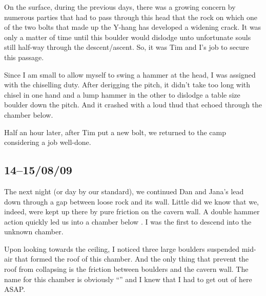 On the surface, during the previous days, there was a growing concern by
numerous parties that had to pass through this head that the rock on
which one of the two bolts that made up the Y-hang has developed a
widening crack. It was only a matter of time until this boulder would
dislodge unto unfortunate souls still half-way through the
descent/ascent. So, it was Tim and I's job to secure this passage.

Since I am small to allow myself to swing a hammer at the head, I was
assigned with the chiselling duty. After derigging the pitch, it didn't
take too long with chisel in one hand and a lump hammer in the other to
dislodge a table size boulder down the pitch. And it crashed with a loud
thud that echoed through the chamber below.

Half an hour later, after Tim put a new bolt, we returned to the camp
considering a job well-done.



\subsection{14--15/08/09}


The next night (or day by our standard), we continued Dan and Jana's
lead down  through a gap between loose rock and its
wall. Little did we know that we, indeed, were kept up there by pure
friction on the cavern wall. A double hammer action quickly led us into
a chamber below . I was the first to descend into the
unknown chamber.

Upon looking towards the ceiling, I noticed three large boulders
suspended mid-air that formed the roof of this chamber. And the only
thing that prevent the roof from collapsing is the friction between
boulders and the cavern wall. The name for this chamber is obviously
``'' and I knew that I had to get out of here ASAP.


